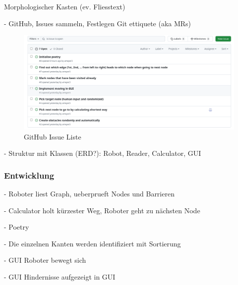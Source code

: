 Morphologischer Kasten (ev. Fliesstext)

- GitHub, Issues sammeln, Festlegen Git ettiquete (aka MRs)

\begin{figure}[H]
\centering
\includegraphics[width=\textwidth]{img/github-issues.png}
\caption{GitHub Issue Liste}
\label{fig:github-issues}
\end{figure}

- Struktur mit Klassen (ERD?): Robot, Reader, Calculator, GUI

\subsubsection{Entwicklung}


- Roboter liest Graph, ueberprueft Nodes und Barrieren

- Calculator holt kürzester Weg, Roboter geht zu nächsten Node

- Poetry

- Die einzelnen Kanten werden identifiziert mit Sortierung

- GUI Roboter bewegt sich

- GUI Hindernisse aufgezeigt in GUI
